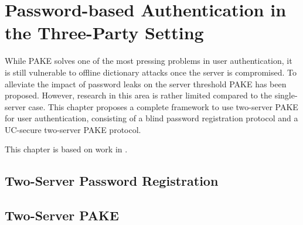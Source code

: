 \chapter{Password-based Authentication in the Three-Party Setting}

While \ac{PAKE} solves one of the most pressing problems in user authentication, it is still vulnerable to offline dictionary attacks once the server is compromised.
To alleviate the impact of password leaks on the server threshold \ac{PAKE} has been proposed.
However, research in this area is rather limited compared to the single-server case.
This chapter proposes a complete framework to use two-server \ac{PAKE} for user authentication, consisting of a blind password registration protocol and a \ac{UC}-secure two-server \ac{PAKE} protocol.

This chapter is based on work in \cite{KieferM14b,KieferM15b,KieferM15c}.

\section{Two-Server Password Registration}



\section{Two-Server PAKE}
